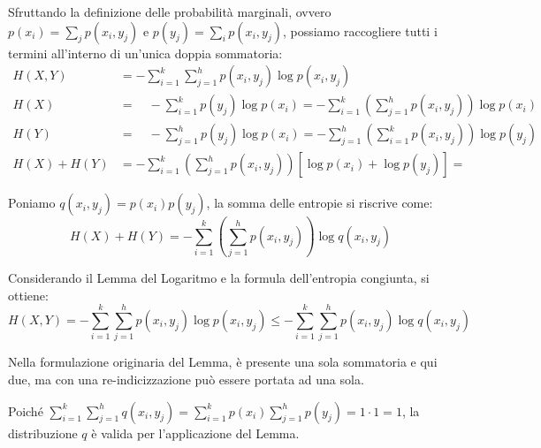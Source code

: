 Sfruttando la definizione delle probabilità marginali, ovvero $p(x_i) = \sum_{j} p(x_i, y_j)$ e $p(y_j) = \sum_{i} p(x_i, y_j)$, possiamo raccogliere tutti i termini all'interno di un'unica doppia sommatoria:
\begin{align*}
    H(X,Y) &= -\sum_{i=1}^{k} \sum_{j=1}^{h} p(x_i, y_j) \log p(x_i, y_j) \\
    H(X)&=\quad - \sum_{i=1}^{k} p(y_j) \log p(x_i) = - \sum_{i=1}^{k}\left(\sum_{j=1}^{h} p(x_i, y_j)\right) \log p(x_i) \\
    H(Y)&=\quad - \sum_{j=1}^{h} p(y_j) \log p(x_i) = - \sum_{j=1}^{h}\left(\sum_{i=1}^{k} p(x_i, y_j)\right) \log p(y_j)  \\
    H(X)+H(Y)&= -\sum_{i=1}^{k}\left(\sum_{j=1}^{h} p(x_i, y_j)\right) \left[\log p(x_i) + \log p(y_j)\right] =
\end{align*}

Poniamo $q(x_i,y_j)=p(x_i)p(y_j)$, la somma delle entropie si riscrive come:
$$H(X)+H(Y)= -\sum_{i=1}^k\left( \sum_{j=1}^h p(x_i,y_j)\right) \log q(x_i,y_j)$$

Considerando il Lemma del Logaritmo e la formula dell'entropia congiunta, si ottiene:
\[
  H(X,Y) = -\sum_{i=1}^{k} \sum_{j=1}^{h} p(x_i, y_j) \log p(x_i, y_j) \leq - \sum_{i=1}^{k} \sum_{j=1}^{h} p(x_i, y_j) \log q(x_i, y_j)
\]

Nella formulazione originaria del Lemma, è presente una sola sommatoria e qui due, ma con una re-indicizzazione può essere portata ad una sola.

Poiché $\sum_{i=1}^k \sum_{j=1}^h q(x_i,y_j) = \sum_{i=1}^k p(x_i) \sum_{j=1}^h p(y_j) = 1 \cdot 1 = 1$, la distribuzione $q$ è valida per l'applicazione del Lemma.

